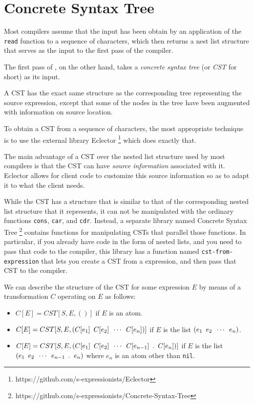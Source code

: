 \chapter{Concrete Syntax Tree}

Most \commonlisp{} compilers assume that the input has been obtain by
an application of the \commonlisp{} \texttt{read} function to a
sequence of characters, which then returns a nest list structure that
serves as the input to the first pass of the compiler.

The first pass of \sysname{}, on the other hand, takes a
\emph{concrete syntax tree} (or \emph{CST} for short) as its input.  

A CST has the exact same structure as the corresponding tree
representing the source expression, except that some of the nodes in
the tree have been augmented with information on source location.

To obtain a CST from a sequence of characters, the most appropriate
technique is to use the external library
Eclector%
\footnote{https://github.com/s-expressionists/Eclector}
which does exactly that.

The main advantage of a CST over the nested list structure used by
most compilers is that the CST can have \emph{source information}
associated with it.  Eclector allows for client code to customize this
source information so as to adapt it to what the client needs.

While the CST has a structure that is similar to that of the
corresponding nested list structure that it represents, it can not be
manipulated with the ordinary \commonlisp{} functions \texttt{cons},
\texttt{car}, and \texttt{cdr}.  Instead, a separate library named
Concrete Syntax Tree%
\footnote{https://github.com/s-expressionists/Concrete-Syntax-Tree}
contains functions for manipulating CSTs that parallel those
\commonlisp{} functions.  In particular, if you already have
\commonlisp{} code in the form of nested lists, and you need to pass
that code to the compiler, this library has a function named
\texttt{cst-from-expression} that lets you create a CST from a
\commonlisp{} expression, and then pass that CST to the compiler.

We can describe the structure of the CST for some expression $E$ by
means of a transformation $C$ operating on $E$ as follows:

\begin{itemize}
\item $C[E] = CST[S, E, ()]$ if $E$ is an atom.
\item $C[E] = CST[S, E,
  (C[e_1]\enskip{}C[e_2]\enskip{}\cdots\enskip{}C[e_n])]$ if $E$ is
  the list $(e_1\enskip{}e_2\enskip{}\cdots\enskip{}e_n)$.
\item $C[E] = CST[S, E,
  (C[e_1]\enskip{}C[e_2]\enskip{}\cdots\enskip{}C[e_{n-1}]\enskip{}.\enskip{}C[e_n])]$
  if $E$ is the list
  $(e_1\enskip{}e_2\enskip{}\cdots\enskip{}e_{n-1}\enskip{}.\enskip{}e_n)$
  where $e_n$ is an atom other than \texttt{nil}.
\end{itemize}

